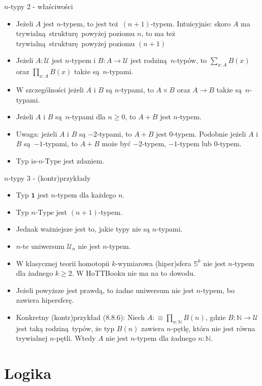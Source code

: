 \documentclass{beamer}
\newcommand{\defn}{:\equiv}
\newcommand{\U}{\mathcal{U}}
\begin{document}
\begin{frame}{$n$-typy 2 - właściwości}
\begin{itemize}
	\item Jeżeli $A$ jest $n$-typem, to jest też $(n + 1)$-typem. Intuicyjnie: skoro $A$ ma trywialną strukturę powyżej poziomu $n$, to ma też trywialną strukturę powyżej poziomu $(n + 1)$
	\item Jeżeli $A : \U$ jest $n$-typem i $B : A \to \U$ jest rodziną $n$-typów, to $\sum_{x : A} B(x)$ oraz $\prod_{x : A} B(x)$ także są $n$-typami.
	\item W szczególności jeżeli $A$ i $B$ są $n$-typami, to $A \times B$ oraz $A \to B$ także są $n$-typami.
	\item Jeżeli $A$ i $B$ są $n$-typami dla $n \geq 0$, to $A + B$ jest $n$-typem.
	\item Uwaga: jeżeli $A$ i $B$ są $-2$-typami, to $A + B$ jest $0$-typem. Podobnie jeżeli $A$ i $B$ są $-1$-typami, to $A + B$ może być $-2$-typem, $-1$-typem lub $0$-typem.
	\item Typ $\text{is-}n\text{-Type}$ jest zdaniem.
\end{itemize}
\end{frame}

\begin{frame}{$n$-typy 3 - (kontr)przykłady}
\begin{itemize}
	\item Typ $\textbf{1}$ jest $n$-typem dla każdego $n$.
	\item Typ $n\text{-Type}$ jest $(n + 1)$-typem.
	\item Jednak ważniejsze jest to, jakie typy nie są $n$-typami.
	\item $n$-te uniwersum $\U_n$ nie jest $n$-typem.
	\item W klasycznej teorii homotopii $k$-wymiarowa (hiper)sfera $\mathbb{S}^k$ nie jest $n$-typem dla żadnego $k \geq 2$. W HoTTBooku nie ma na to dowodu.
	\item Jeżeli powyższe jest prawdą, to żadne uniwersum nie jest $n$-typem, bo zawiera hipersferę.
	\item Konkretny (kontr)przykład (8.8.6): Niech $A \defn \prod_{n : \mathbb{N}} B(n)$, gdzie $B : \mathbb{N} \to \U$ jest taką rodziną typów, że typ $B(n)$ zawiera $n$-pętlę, która nie jest równa trywialnej $n$-pętli. Wtedy $A$ nie jest $n$-typem dla żadnego $n : \mathbb{N}$.
\end{itemize}
\end{frame}

\section{Logika}
\end{document}
